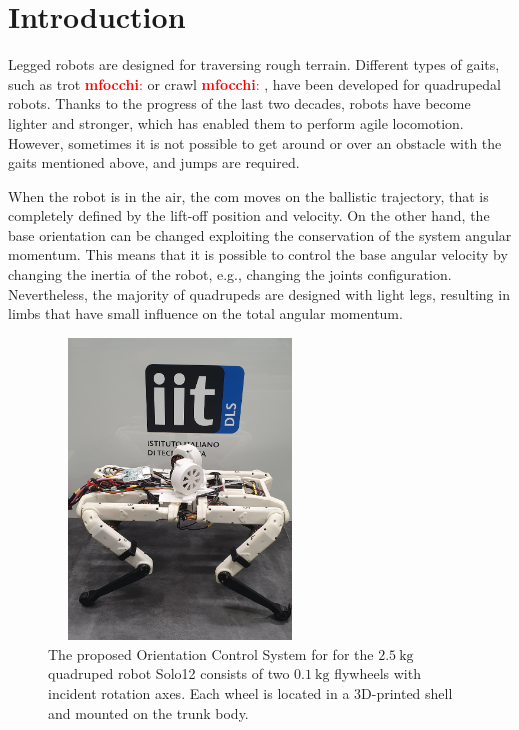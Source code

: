 \documentclass[sensors,article,submit,pdftex,moreauthors]{Definitions/mdpi}
\newcommand{\MF}[1]{\textcolor{red}{\textbf{mfocchi}: #1}}
\begin{document}
\section{Introduction}\label{sec:introduction}
Legged robots are designed for traversing rough terrain.
Different types of gaits, such as trot \MF{\cite{barasuol2013reactive}} or crawl \MF{\cite{focchi2020heuristic}}, have been developed for quadrupedal robots. 
Thanks to the progress of the last two decades, robots have become lighter and stronger, which has enabled them to perform agile locomotion.
However, sometimes it is not possible to get around or over an obstacle with the gaits mentioned above, and jumps are required. 

When the robot is in the air, the \gls{com} moves on the ballistic trajectory, that is completely defined by the lift-off position and velocity. On the other hand, the base orientation can be changed exploiting the conservation of the system angular momentum. This means that it is possible to control the base angular velocity by changing the inertia of the robot, e.g., changing the joints configuration. Nevertheless, the majority of quadrupeds are designed with light legs, resulting in limbs that have small influence on the total angular momentum.

\begin{figure}[t!]
	\centering
	\includegraphics[width=7cm,height=8cm,keepaspectratio]{figures/solo_fw_pic_compressed.png}
	\caption{\small The proposed Orientation Control System for 
		for the $2.5 \ \mathrm{kg}$ quadruped robot Solo12 consists of two $0.1 \ \mathrm{kg}$ flywheels with incident rotation axes. Each wheel is located in a 3D-printed shell and mounted on the trunk body.}
	\label{fig:solo12flywheels}
\end{figure} 
\end{document}
